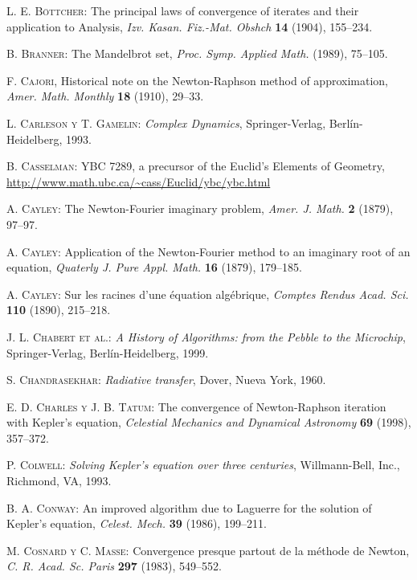 \begin{thebibliography}{999}
\textsc{L. E. B\"ottcher}: {The principal laws of convergence of iterates and their application to Analysis}, 
\textit{Izv. Kasan. Fiz.-Mat. Obshch} \textbf{14} (1904), 155--234.

\textsc{B. Branner}: 
{The Mandelbrot set}, 
\textit{Proc. Symp. Applied Math.} (1989), 75--105.

\textsc{F. Cajori},
Historical note on the Newton-Raphson method of approximation,
\textit{Amer. Math. Monthly} \textbf{18} (1910),  29--33.

 \textsc{L. Carleson y T. Gamelin}:
 \textit{Complex Dynamics}, Springer-Verlag, Berlín-Heidelberg, 1993.

 \textsc{B. Casselman}:
YBC 7289, a precursor of the Euclid's Elements of Geometry,
\url{http://www.math.ubc.ca/~cass/Euclid/ybc/ybc.html}

\textsc{A. Cayley}:
 {The Newton-Fourier imaginary problem},
\textit{Amer. J. Math.} \textbf{2} (1879), 97--97.

\textsc{A. Cayley}:
{Application of the Newton-Fourier method to an
imaginary root  of an equation},
\textit{Quaterly J. Pure Appl. Math.} \textbf{16} (1879), 179--185.

\textsc{A. Cayley}:
 {Sur les racines d'une équation algébrique},
\textit{Comptes Rendus Acad. Sci.} \textbf{110} (1890), 215--218.


\textsc{J. L. Chabert et al.}:%
\textit{A History of Algorithms: from the Pebble to the Microchip},
Springer-Verlag, Berlín-Heidelberg, 1999.

\textsc{S. Chandrasekhar}:
\textit{Radiative transfer},
Dover, Nueva York, 1960.

\textsc{E. D. Charles  y J. B. Tatum}: {The convergence of Newton-Raphson iteration with  Kepler's equation},
\textit{Celestial Mechanics and Dynamical Astronomy} \textbf{69} (1998), 357--372.

\textsc{P. Colwell}:
\textit{Solving Kepler's equation over three centuries},
Willmann-Bell, Inc., Richmond, VA, 1993.


\textsc{B. A. Conway}: {An improved algorithm due to Laguerre  for the solution of  Kepler's equation},
 \textit{Celest. Mech.} \textbf{39} (1986), 199--211.

\textsc{M. Cosnard y C.  Masse}:
{Convergence presque partout de la m\'ethode de Newton},
\textit{C. R. Acad. Sc. Paris} \textbf{297} (1983), 549--552.
 

\end{thebibliography}
